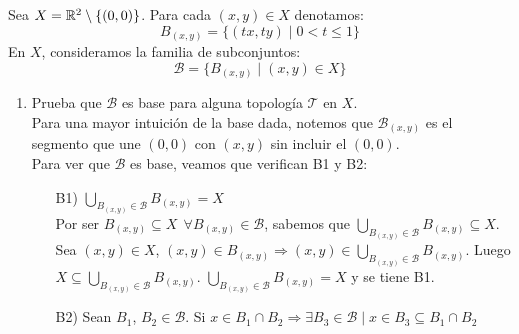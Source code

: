 \documentclass[12pt]{article}
\begin{document}
    \begin{ejercicio}[4.5 puntos]
        Sea $X = \mathbb{R}^2 \setminus \{(0,0)\}$. Para cada $(x,y) \in X$ denotamos:
        $$B_{(x,y)} = \{(tx, ty) \mid 0 < t \leq 1 \}$$
        En $X$, consideramos la familia de subconjuntos:
        $$\mathcal{B} = \{B_{(x,y)} \mid (x,y) \in X\}$$
        \begin{enumerate}[label=(\alph*)]
            \item Prueba que $\mathcal{B}$ es base para alguna topología $\mathcal{T}$ en $X$.\\

                \noindent
                Para una mayor intuición de la base dada, notemos que $\mathcal{B}_{(x,y)}$ es el segmento que une $(0,0)$ con $(x,y)$ sin incluir el $(0,0)$.\\

                \noindent
                Para ver que $\mathcal{B}$ es base, veamos que verifican B1 y B2:
                \begin{enumerate}
                    \item[B1)] $\displaystyle \bigcup_{B_{(x,y)} \in \mathcal{B}} B_{(x,y)} = X$\\

                        \noindent
                        Por ser $B_{(x,y)} \subseteq X ~~\forall B_{(x,y)} \in \mathcal{B}$, sabemos que $\displaystyle \bigcup_{B_{(x,y)} \in \mathcal{B}} B_{(x,y)} \subseteq X$.\newline
                        Sea $(x,y) \in X$, $(x,y) \in B_{(x,y)} \Rightarrow (x,y) \in \displaystyle \bigcup_{B_{(x,y)} \in \mathcal{B}} B_{(x,y)}$.\newline
                        Luego $X \subseteq \displaystyle \bigcup_{B_{(x,y)} \in \mathcal{B}} B_{(x,y)}$.\newline
                        $\displaystyle \bigcup_{B_{(x,y)} \in \mathcal{B}} B_{(x,y)} = X$ y se tiene B1.
                    \item[B2)] Sean $B_1$, $B_2 \in \mathcal{B}$. Si $x \in B_1 \cap B_2 \Rightarrow \exists B_3 \in \mathcal{B} \mid x \in B_3 \subseteq B_1 \cap B_2$\\


\end{enumerate}
\end{enumerate}
\end{ejercicio}
\end{document}
